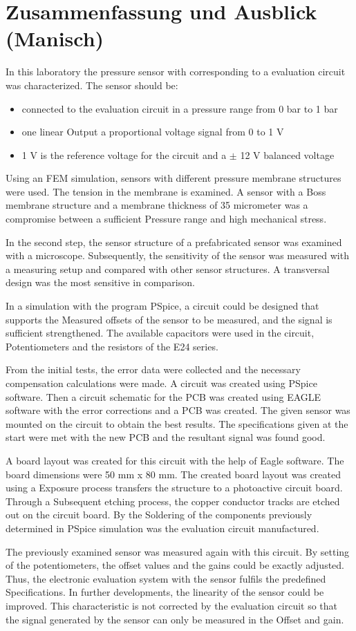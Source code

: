 \chapter{Zusammenfassung und Ausblick (Manisch)}
\label{sec:Zusammenfassung}
In this laboratory the pressure sensor with corresponding to a evaluation circuit was characterized. The sensor should be:

\begin{itemize}
	\item connected to the evaluation circuit in a pressure range from 0 bar to 1 bar
	\item one linear Output a proportional voltage signal from 0 to 1 V
	\item 1 V is the reference voltage for the circuit and a $\pm$ 12 V balanced voltage
\end{itemize}

Using an FEM simulation, sensors with different pressure membrane structures were used. The tension in the membrane is examined. A sensor with a Boss membrane structure and a membrane thickness of 35 micrometer was a compromise between a sufficient Pressure range and high mechanical stress.

In the second step, the sensor structure of a prefabricated sensor was examined with a microscope. Subsequently, the sensitivity of the sensor was measured with a measuring setup and compared with other sensor structures. A transversal design was the most sensitive in comparison.

In a simulation with the program PSpice, a circuit could be designed that supports the Measured offsets of the sensor to be measured, and the signal is sufficient strengthened. The available capacitors were used in the circuit, Potentiometers and the resistors of the E24 series.

From the initial tests, the error data were collected and the necessary compensation calculations were made. A circuit was created using PSpice software. Then a circuit schematic for the PCB was created using EAGLE software with the error corrections and a PCB was created. The given sensor was mounted on the circuit to obtain the best results. The specifications given at the start were met with the new PCB and the resultant signal was found good.

A board layout was created for this circuit with the help of Eagle software. The board dimensions were 50 mm x 80 mm. The created board layout was created using a Exposure process transfers the structure to a photoactive circuit board. Through a Subsequent etching process, the copper conductor tracks are etched out on the circuit board. By the Soldering of the components previously determined in PSpice simulation was the evaluation circuit manufactured.

The previously examined sensor was measured again with this circuit. By setting of the potentiometers, the offset values and the gains could be exactly adjusted. Thus, the electronic evaluation system with the sensor fulfils the predefined Specifications. In further developments, the linearity of the sensor could be improved. This characteristic is not corrected by the evaluation circuit so that the signal generated by the sensor can only be measured in the Offset and gain.